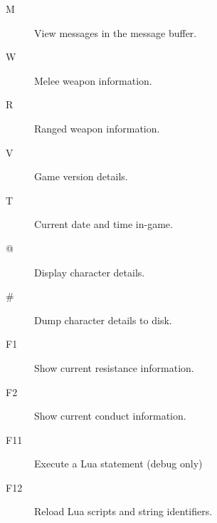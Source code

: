 \begin{description}
\item[M]
View messages in the message buffer.
\item[W] 
Melee weapon information.
\item[R] 
Ranged weapon information.
\item[V] 
Game version details.
\item[T] 
Current date and time in-game.
\item[@]
Display character details.
\item[\#] 
Dump character details to disk.
\item[F1] 
Show current resistance information.
\item[F2] 
Show current conduct information.
\item[F11] 
Execute a Lua statement (debug only)
\item[F12] 
Reload Lua scripts and string identifiers.
\end{description}

